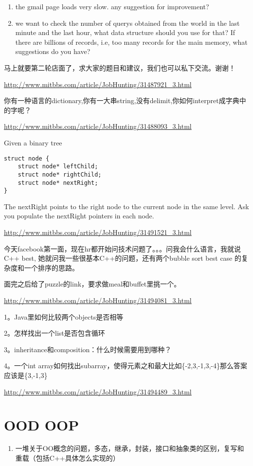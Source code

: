 \documentclass[12pt]{book}
\begin{document}
\begin{enumerate}
\item the gmail page loads very slow. any suggestion for improvement?

\item we want to check the number of querys obtained from the world in the last minute and the last hour, what data structure should you use for that? If there are billions of records, i.e, too many records for the main memory, what suggestions do you have?
\end{enumerate}

马上就要第二轮店面了，求大家的题目和建议，我们也可以私下交流。谢谢！

\url{http://www.mitbbs.com/article/JobHunting/31487921_3.html}

你有一种语言的dictionary,你有一大串string,没有delimit,你如何interpret成字典中的字呢？

\url{http://www.mitbbs.com/article/JobHunting/31488093_3.html}

Given a binary tree
\lstset{language=java,label= ,caption= ,numbers=none}
\begin{lstlisting}
struct node {
    struct node* leftChild;
    struct node* rightChild;
    struct node* nextRight;
}
\end{lstlisting}
The nextRight points to the right node to the current node in the same level. Ask you populate the nextRight pointers in each node.

\url{http://www.mitbbs.com/article/JobHunting/31491521_3.html}

今天facebook第一面，现在hr都开始问技术问题了。。。问我会什么语言，我就说C++ best, 她就问我一些很基本C++的问题，还有两个bubble sort best case 的复杂度和一个排序的思路。 

面完之后给了puzzle的link，要求做meal和buffet里挑一个。 

\url{http://www.mitbbs.com/article/JobHunting/31494081_3.html}

1。Java里如何比较两个objects是否相等

2。怎样找出一个list是否包含循环 

3。inheritance和composition：什么时候需要用到哪种？

4。一个int array如何找出subarray，使得元素之和最大比如\{-2,3,-1,3,-4\}那么答案应该是\{3,-1,3\}

\url{http://www.mitbbs.com/article/JobHunting/31494489_3.html}

\chapter{OOD OOP}
\label{sec-12}
\begin{enumerate}
\item 一堆关于OO概念的问题，多态，继承，封装，接口和抽象类的区别，复写和重载（包括C++具体怎么实现的）
\end{enumerate}
\end{document}
